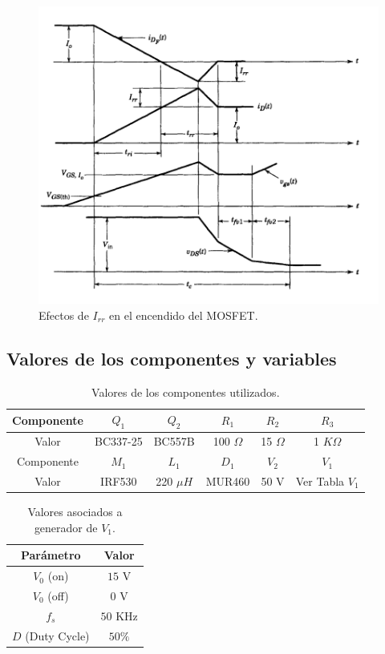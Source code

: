 \documentclass[e4_tp1_main.tex]{subfiles}
\begin{document}
\begin{figure}[H]
  \centering
  \includegraphics[width=\linewidth/2]{images/ej1/diode_irr.png}
  \caption{Efectos de $I_{rr}$ en el encendido del MOSFET.}
  \label{fig:mosfet_irr}
\end{figure}

\subsection{Valores de los componentes y variables}
\begin{table}[H]
\centering
\begin{tabular}{|c|c|c|c|c|c|}
\hline
Componente & $Q_1$ & $Q_2$ & $R_1$ & $R_2$ & $R_3$ \\
\hline
Valor & BC337-25 & BC557B & 100 $\Omega$ & 15 $\Omega$ & 1 $K\Omega$ \\
\hline
Componente & $M_1$ & $L_1$ & $D_1$ & $V_2$ & $V_1$\\
\hline
Valor & IRF530 & 220 $\mu H$ & MUR460 & 50 V & Ver Tabla $V_1$\\
\hline
\end{tabular}
\caption{Valores de los componentes utilizados.}
\end{table}

\begin{table}[H]
\centering
\begin{tabular}{|c|c|}
\hline
Parámetro & Valor \\
\hline
$V_0$ (on) & $15$ V \\
\hline
$V_0$ (off) & $0$ V \\
\hline
$f_s$ & $50$ KHz \\
\hline
$D$ (Duty Cycle) & $50\%$ \\
\hline
\end{tabular}
\caption{Valores asociados a generador de $V_1$.}
\end{table}
\end{document}
